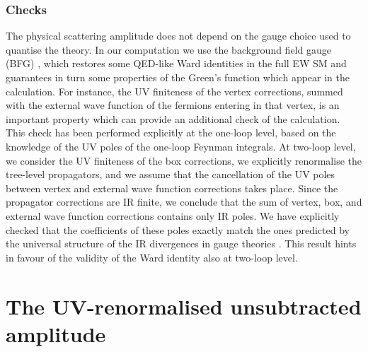 \documentclass[11pt,a4paper]{article}
\begin{document}
\subsubsection{Checks}
The physical scattering amplitude does not depend on the gauge choice used to quantise the theory.
In our computation we use the background field gauge (BFG) \cite{Denner:1994xt}, which restores some QED-like Ward identities in the full EW SM
and guarantees in turn some properties of the Green's function which appear in the calculation.
For instance, the UV finiteness of the vertex corrections, summed with the external wave function of the fermions entering in that vertex, is an important property which can provide an additional check of the calculation.
This check has been performed explicitly at the one-loop level, based on the knowledge of the UV poles of the one-loop Feynman integrals.
At two-loop level, we consider the UV finiteness of the box corrections,
we explicitly renormalise the tree-level propagators, and we assume
that the cancellation of the UV poles between vertex and external wave function corrections takes place.
Since the propagator corrections are IR finite,
we conclude that the sum of vertex, box, and external wave function corrections contains only IR poles.
We have explicitly checked that the coefficients of these poles
exactly match the ones predicted by the universal structure
of the IR divergences in gauge theories \cite{Catani:1998bh}.
This result hints in favour of the validity of the Ward identity
also at two-loop level.




\section{The UV-renormalised unsubtracted amplitude}
\label{sec:ampl}
\end{document}
